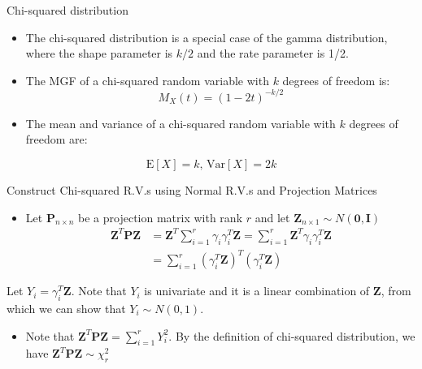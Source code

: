 \documentclass[
  ignorenonframetext,
]{beamer}
\providecommand{\tightlist}{%
  \setlength{\itemsep}{0pt}\setlength{\parskip}{0pt}}
\begin{document}
\begin{frame}{Chi-squared distribution}
\protect\hypertarget{chi-squared-distribution-1}{}
\begin{itemize}
\item
  The chi-squared distribution is a special case of the gamma
  distribution, where the shape parameter is \(k/2\) and the rate
  parameter is 1/2.
\item
  The MGF of a chi-squared random variable with \(k\) degrees of freedom
  is: \[
  M_X(t) = (1-2t)^{-k/2}
  \]
\item
  The mean and variance of a chi-squared random variable with \(k\)
  degrees of freedom are:
\end{itemize}

\[\text{E}[X] = k \mbox{, }\text{Var}[X] = 2k\]
\end{frame}

\begin{frame}{Construct Chi-squared R.V.s using Normal R.V.s and
Projection Matrices}
\protect\hypertarget{construct-chi-squared-r.v.s-using-normal-r.v.s-and-projection-matrices}{}
\begin{itemize}
\tightlist
\item
  Let \(\mathbf P_{n\times n}\) be a projection matrix with rank \(r\)
  and let \(\mathbf Z_{n\times 1}\sim N(\mathbf 0, \mathbf I)\) \[
  \begin{aligned}
  \mathbf Z^T \mathbf P \mathbf Z &= \mathbf Z^T \sum_{i=1}^r \gamma_i \gamma_i^T \mathbf Z= \sum_{i=1}^r \mathbf Z^T \gamma_i \gamma_i^T \mathbf Z\\
  &= \sum_{i=1}^r (\gamma_i^T \mathbf Z)^T(\gamma_i^T \mathbf Z)
  \end{aligned}
  \]
\end{itemize}

Let \(Y_i = \gamma_i^T \mathbf Z\). Note that \(Y_i\) is univariate and
it is a linear combination of \(\mathbf Z\), from which we can show that
\(Y_i \sim N(0, 1)\).

\begin{itemize}
\tightlist
\item
  Note that \(\mathbf Z^T \mathbf P \mathbf Z=\sum_{i=1}^r Y_i^2\). By
  the definition of chi-squared distribution, we have
  \(\mathbf Z^T \mathbf P \mathbf Z\sim \chi_r^2\)
\end{itemize}
\end{frame}
\end{document}
